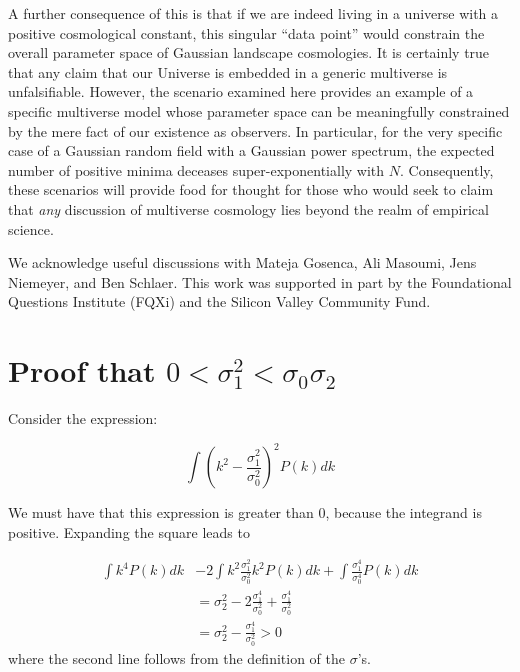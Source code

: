 \documentclass[12pt]{article}
\begin{document}
A further consequence of this is that if we are indeed living in a universe with a positive cosmological constant, this singular  ``data point'' would constrain the overall parameter space of Gaussian landscape cosmologies. It is certainly true that any claim that our Universe is embedded in a generic multiverse is unfalsifiable. However, the scenario examined here provides an example of a specific  multiverse model whose parameter space can be meaningfully constrained by the mere fact of our existence as observers. In particular, for the very specific case of a Gaussian random field with a Gaussian power spectrum, the expected number of positive minima deceases super-exponentially with $N$. Consequently, these scenarios will provide food for thought for those who would seek to claim that {\em any \/} discussion of multiverse cosmology lies beyond the realm of empirical science.

 \acknowledgments We acknowledge useful discussions with  Mateja Gosenca,  Ali Masoumi, Jens Niemeyer, and Ben Schlaer. This work was supported in part by the Foundational Questions Institute (FQXi)  and the Silicon Valley Community Fund. 
 
 
\appendix
 

\section{Proof that $0 < \sigma_1^2 < \sigma_0\sigma_2$} \label{Proof}

Consider the expression:

\begin{equation}
\int (k^2 - \frac{\sigma_1^2}{\sigma_0^2})^2 P(k) dk
\end{equation}

\noindent We must have that this expression is greater than 0, because the integrand is positive. Expanding the square leads to

\begin{equation}
\begin{split}
\int k^4 P(k) dk &- 2 \int k^2 \frac{\sigma_1^2}{\sigma_0^2}k^2 P(k) dk + \int \frac{\sigma_1^4}{\sigma_0^4} P(k) dk \\
&= \sigma_2^2 - 2 \frac{\sigma_1^4}{\sigma_0^2} + \frac{\sigma_1^4}{\sigma_0^2} \\
&= \sigma_2^2 - \frac{\sigma_1^4}{\sigma_0^2} > 0
\end{split}
\end{equation}
where the second line follows from the definition of the $\sigma$'s.
\end{document}
